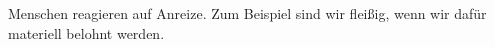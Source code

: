 Menschen reagieren auf Anreize.
Zum Beispiel sind wir fleißig, wenn wir dafür materiell belohnt werden.